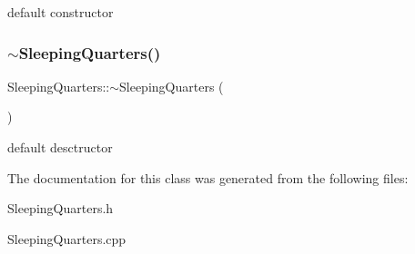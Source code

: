 default constructor \mbox{\label{classSleepingQuarters_ad32e286540e322186993b15f5ebcffbc}} 
\subsubsection{\texorpdfstring{$\sim$\+Sleeping\+Quarters()}{~SleepingQuarters()}}
{\footnotesize\ttfamily Sleeping\+Quarters\+::$\sim$\+Sleeping\+Quarters (\begin{DoxyParamCaption}{ }\end{DoxyParamCaption})}

default desctructor 

The documentation for this class was generated from the following files\+:\begin{DoxyCompactItemize}
\item 
Sleeping\+Quarters.\+h\item 
Sleeping\+Quarters.\+cpp\end{DoxyCompactItemize}
